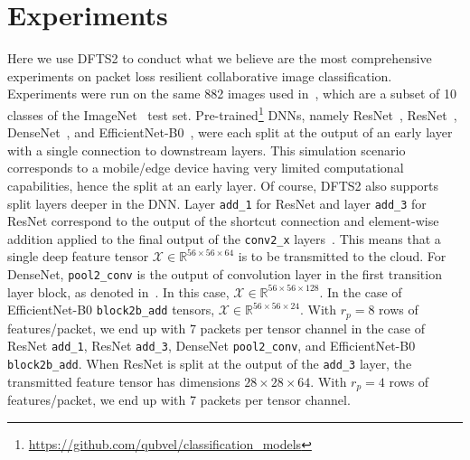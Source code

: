 \documentclass[conference,letterpaper]{IEEEtran}
\begin{document}
\section{Experiments} 
\label{sec:experiments}
Here we use DFTS2 to conduct what we believe are the most comprehensive experiments on packet loss resilient collaborative image classification. Experiments  were run on the same 882 images used in~\cite{unnibhavi2018dfts,CALTeC_ICIP_2021}, which are a subset of 10 classes of the ImageNet~\cite{imagenet2015} test set. Pre-trained\footnote{\url{https://github.com/qubvel/classification_models}} DNNs, namely ResNet~\cite{ResNet}, ResNet~\cite{ResNet}, DenseNet~\cite{densenet2017}, and EfficientNet\nobreakdash-B0~\cite{efficientnetpaper}, were each split at the output of an early layer with a single connection to downstream layers. 
This simulation scenario corresponds to a mobile/edge device having very limited computational capabilities,
hence the split at an early layer. Of course, DFTS2 also supports split layers deeper in the DNN. %
Layer \texttt{add\_1} for ResNet and layer \texttt{add\_3} for ResNet correspond to the output of the shortcut connection and element-wise addition applied to the final output of the \texttt{conv2\_x} layers~\cite[Table~1]{ResNet}. This means that a single deep feature tensor
$\mathcal{X} \in \mathbb{R}^{56 \times 56 \times 64}$
is to be transmitted %
to the cloud.
For DenseNet, \texttt{pool2\_conv} is the output of convolution layer in the first transition layer block, as denoted in~\cite[Table~1]{densenet2017}. In this case, $\mathcal{X} \in \mathbb{R}^{56 \times 56 \times 128}$. In the case of EfficientNet\nobreakdash-B0 \texttt{block2b\_add} tensors, $\mathcal{X} \in  \mathbb{R}^{56 \times 56 \times 24}$. With $r_p = 8$ rows of features/packet, we end up with 7 packets per tensor channel in the case of ResNet \texttt{add\_1}, ResNet \texttt{add\_3}, DenseNet \texttt{pool2\_conv}, and EfficientNet\nobreakdash-B0 \texttt{block2b\_add}. When ResNet is split at the output of the \texttt{add\_3} layer, the transmitted feature tensor has dimensions $28 \times 28 \times 64$. With $r_p = 4$ rows of features/packet, we end up with 7 packets per tensor channel.
\end{document}
